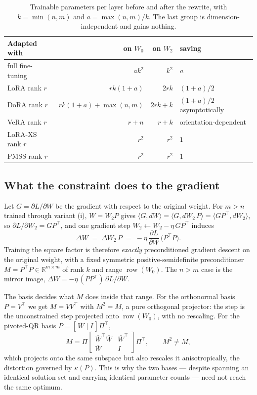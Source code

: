 \documentclass{article}
\theoremstyle{remark}
\begin{document}
\begin{table}[t]\centering
\caption{Trainable parameters per layer before and after the rewrite, with
$k=\min(n,m)$ and $a=\max(n,m)/k$. The last group is dimension-independent and
gains nothing.}
\label{tab:acct}
\begin{tabular}{lrrl}
\toprule
Adapted with & on $W_0$ & on $W_2$ & saving \\
\midrule
full fine-tuning  & $ak^2$              & $k^2$    & $a$ \\
LoRA rank $r$     & $rk(1+a)$           & $2rk$    & $(1+a)/2$ \\
DoRA rank $r$     & $rk(1+a)+\max(n,m)$ & $2rk+k$  & $(1+a)/2$ asymptotically \\
VeRA rank $r$     & $r+n$               & $r+k$    & orientation-dependent \\
\midrule
LoRA-XS rank $r$  & $r^2$               & $r^2$    & $1$ \\
PMSS rank $r$     & $r^2$               & $r^2$    & $1$ \\
\bottomrule
\end{tabular}
\end{table}

\subsection{What the constraint does to the gradient}
Let $G=\partial L/\partial W$ be the gradient with respect to the original
weight. For $m>n$ trained through variant (i), $W=W_2P$ gives
$\langle G,dW\rangle=\langle G,dW_2\,P\rangle=\langle GP^{\top},dW_2\rangle$, so
$\partial L/\partial W_2=GP^{\top}$, and one gradient step
$W_2\leftarrow W_2-\eta\,GP^{\top}$ induces
\begin{equation}
  \Delta W \;=\; \Delta W_2\,P \;=\; -\eta\,\frac{\partial L}{\partial W}\,\bigl(P^{\top}P\bigr).
  \label{eq:precond}
\end{equation}
Training the square factor is therefore \emph{exactly} preconditioned gradient
descent on the original weight, with a fixed symmetric positive-semidefinite
preconditioner $M=P^{\top}P\in\mathbb{R}^{m\times m}$ of rank $k$ and range
$\operatorname{row}(W_0)$. The $n>m$ case is the mirror image,
$\Delta W=-\eta\,(PP^{\top})\,\partial L/\partial W$.

The basis decides what $M$ does inside that range. For the orthonormal basis
$P=V^{\top}$ we get $M=VV^{\top}$ with $M^2=M$, a pure orthogonal projector:
the step is the unconstrained step projected onto $\operatorname{row}(W_0)$,
with no rescaling. For the pivoted-QR basis
$P=[\,\overline{W}\mid I\,]\Pi^{\top}$,
\[
  M=\Pi\begin{bmatrix}
        \overline{W}^{\top}\overline{W} & \overline{W}^{\top}\\
        \overline{W} & I
      \end{bmatrix}\Pi^{\top},
  \qquad M^2\neq M,
\]
which projects onto the same subspace but also rescales it anisotropically, the
distortion governed by $\kappa(P)$. This is why the two bases --- despite
spanning an identical solution set and carrying identical parameter counts ---
need not reach the same optimum.
\end{document}
